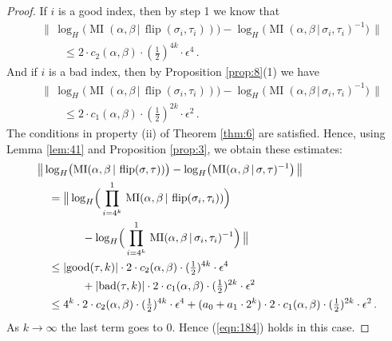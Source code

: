 \documentclass[10pt, a4paper]{amsart}
\theoremstyle{definition}
\numberwithin{equation}{section}
\newcommand{\opn}{\operatorname}
\newcommand{\smfrac}[2]{{\textstyle \frac{#1}{#2}}}
\newcommand{\Norm}[1]{\bigl\lVert\, #1 \, \bigr\rVert}
\newcommand{\abs}[1]{\lvert #1 \rvert}
\renewcommand{\vert}{\, | \,}
\begin{document}
\begin{proof}
If $i$ is a good index, then by step 1 we know that 
\[ \begin{aligned}
& \Norm{ \log_H \bigl( 
\opn{MI} ( \alpha, \beta \vert \opn{flip}(\sigma_i, \tau_i) ) \bigr)
- \log_H \bigl( 
\opn{MI} ( \alpha, \beta \vert \sigma_i, \tau_i)^{-1} \bigr) } \\
& \qquad \leq 2 \cdot  c_2(\alpha, \beta) \cdot (\smfrac{1}{2})^{4 k} \cdot 
\epsilon^4 \, .
\end{aligned} \]
And if $i$ is a bad index, then by Proposition \ref{prop:8}(1) we have
\begin{equation} \label{eqn:192}
\begin{aligned}
& \Norm{ \log_H \bigl( 
\opn{MI} ( \alpha, \beta \vert \opn{flip}(\sigma_i, \tau_i) ) \bigr)
- \log_H \bigl( 
\opn{MI} ( \alpha, \beta \vert \sigma_i, \tau_i)^{-1} \bigr) } \\
& \qquad \leq 2 \cdot  c_1(\alpha, \beta) \cdot (\smfrac{1}{2})^{2 k} \cdot 
\epsilon^2 \, .
\end{aligned}
\end{equation}
The conditions in property (ii) of Theorem \ref{thm:6} are satisfied. Hence,
using Lemma \ref{lem:41} and Proposition \ref{prop:3}, we obtain these
estimates:
\[ \begin{aligned}
& \Norm{ \log_H \bigl( 
\opn{MI} ( \alpha, \beta \vert \opn{flip}(\sigma, \tau) ) \bigr) -
\log_H \bigl( 
\opn{MI} ( \alpha, \beta \vert \sigma, \tau)^{-1} \bigr) } \\
& \quad = \Norm{ \log_H \Bigl( \,
\prod_{i = 4^k}^1 \, 
\opn{MI} ( \alpha, \beta \vert \opn{flip}(\sigma_i, \tau_i) ) \Bigr) \\
& \qquad \qquad - \log_H \Bigl( \,
\prod_{i = 4^k}^1 \, 
\opn{MI} ( \alpha, \beta \vert \sigma_i, \tau_i)^{-1} \Bigr) } \\
& \quad \leq 
\abs{ \opn{good}(\tau, k) } \cdot 2 \cdot  c_2(\alpha, \beta) \cdot
(\smfrac{1}{2})^{4 k} \cdot  \epsilon^4 \\
& \qquad \qquad +
\abs{ \opn{bad}(\tau, k) } \cdot 2 \cdot  c_1(\alpha, \beta) \cdot 
(\smfrac{1}{2})^{2 k} \cdot  \epsilon^2 \\
& \quad \leq 
4^k \cdot 2 \cdot  c_2(\alpha, \beta) \cdot
(\smfrac{1}{2})^{4 k} \cdot  \epsilon^4 +
(a_0 + a_1 \cdot 2^k) \cdot 2 \cdot  c_1(\alpha, \beta) \cdot 
(\smfrac{1}{2})^{2 k} \cdot  \epsilon^2 \, . 
\end{aligned} \]
As $k \to \infty$ the last term goes to $0$. Hence (\ref{eqn:184}) holds in
this case.


\end{proof}
\end{document}
